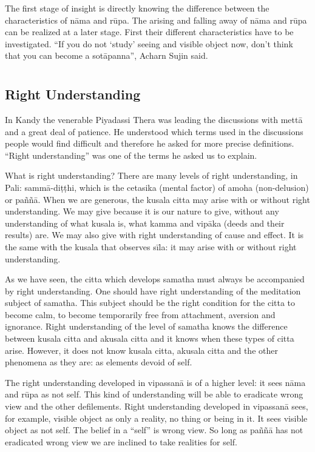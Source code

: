 The first stage of insight is directly knowing the difference between
the characteristics of nāma and rūpa. The arising and falling away of
nāma and rūpa can be realized at a later stage. First their different
characteristics have to be investigated. ``If you do not `study' seeing
and visible object now, don't think that you can become a sotāpanna'',
Acharn Sujin said.



\chapter[Right Understanding]{}
\section*{Right Understanding}

In Kandy the venerable Piyadassi Thera was leading the discussions with
mettā and a great deal of patience. He understood which terms used in
the discussions people would find difficult and therefore he asked for
more precise definitions. ``Right understanding'' was one of the terms
he asked us to explain.

What is right understanding? There are many levels of right
understanding, in Pali: sammā-diṭṭhi, which is the cetasika (mental
factor) of amoha (non-delusion) or paññā. When we are generous, the
kusala citta may arise with or without right understanding. We may give
because it is our nature to give, without any understanding of what
kusala is, what kamma and vipāka (deeds and their results) are. We may
also give with right understanding of cause and effect. It is the same
with the kusala that observes sīla: it may arise with or without right
understanding.

As we have seen, the citta which develops samatha must always be
accompanied by right understanding. One should have right understanding
of the meditation subject of samatha. This subject should be the right
condition for the citta to become calm, to become temporarily free from
attachment, aversion and ignorance. Right understanding of the level of
samatha knows the difference between kusala citta and akusala citta and
it knows when these types of citta arise. However, it does not know
kusala citta, akusala citta and the other phenomena as they are: as
elements devoid of self.

The right understanding developed in vipassanā is of a higher level: it
sees nāma and rūpa as not self. This kind of understanding will be able
to eradicate wrong view and the other defilements. Right understanding
developed in vipassanā sees, for example, visible object as only a
reality, no thing or being in it. It sees visible object as not self.
The belief in a ``self'' is wrong view. So long as paññā has not
eradicated wrong view we are inclined to take realities for self.

